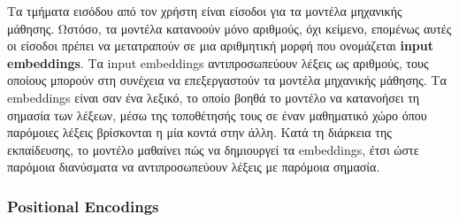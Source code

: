 \documentclass[12pt]{extarticle}
\begin{document}




Τα τμήματα εισόδου από τον χρήστη είναι είσοδοι για τα μοντέλα μηχανικής μάθησης. Ωστόσο, τα μοντέλα κατανοούν μόνο αριθμούς, όχι κείμενο, επομένως αυτές οι είσοδοι πρέπει να μετατραπούν σε μια αριθμητική μορφή που ονομάζεται \textbf{input embeddings}. Tα input embeddings αντιπροσωπεύουν λέξεις ως αριθμούς, τους οποίους μπορούν στη συνέχεια να επεξεργαστούν τα μοντέλα μηχανικής μάθησης. Τα embeddings είναι σαν ένα λεξικό, το οποίο βοηθά το μοντέλο να κατανοήσει τη σημασία των λέξεων, μέσω της τοποθέτησής τους σε έναν μαθηματικό χώρο όπου παρόμοιες λέξεις βρίσκονται η μία κοντά στην άλλη. Κατά τη διάρκεια της εκπαίδευσης, το μοντέλο μαθαίνει πώς να δημιουργεί τα embeddings, έτσι ώστε παρόμοια διανύσματα να αντιπροσωπεύουν λέξεις με παρόμοια σημασία.

\subsubsection{Positional Encodings}
\end{document}
